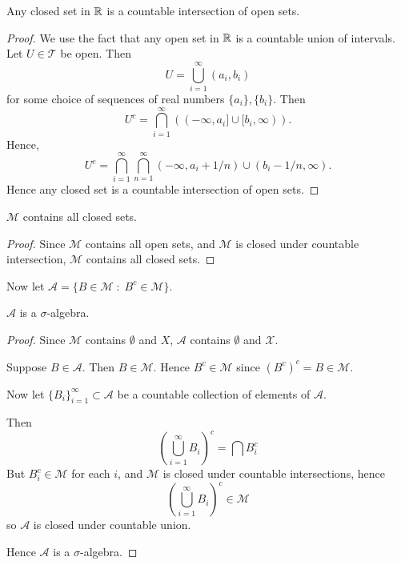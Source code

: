 \documentclass{unswmaths}
\begin{document}
\begin{lemma}
    Any closed set in $\mathbb{R}$ is a countable intersection of open sets.
\end{lemma} 
\begin{proof}
    We use the fact that any open set in $\mathbb{R}$ is a countable
    union of intervals. Let $U \in \mathcal{T}$ be open. Then
    \begin{equation*}
        U = \bigcup_{i=1}^\infty (a_i,b_i)
    \end{equation*}
    for some choice of sequences of real numbers $\{a_i\},\{b_i\}$. 
    Then
    \begin{equation*}
        U^c = \bigcap_{i=1}^\infty ((-\infty,a_i]\cup[b_i,\infty)).
    \end{equation*}
    Hence,
    \begin{equation*}
        U^c = \bigcap_{i=1}^\infty \bigcap_{n=1}^\infty (-\infty,a_i+1/n)\cup(b_i-1/n,\infty).
    \end{equation*}
    Hence any closed set is a countable intersection of open sets.    
\end{proof}
\begin{lemma}
    $\mathcal{M}$ contains all closed sets.
\end{lemma}
\begin{proof}
    Since $\mathcal{M}$ contains all open sets, and $\mathcal{M}$ is closed
    under countable intersection, $\mathcal{M}$ contains all closed sets.    
\end{proof}
Now let $\mathcal{A} = \{B \in \mathcal{M}\;:\;B^c \in \mathcal{M}\}$.
\begin{lemma}
    $\mathcal{A}$ is a $\sigma$-algebra.
\end{lemma}
\begin{proof}
    Since $\mathcal{M}$ contains $\emptyset$ and $X$, $\mathcal{A}$ contains
    $\emptyset$ and $\mathcal{X}$.
    
    Suppose $B \in \mathcal{A}$. Then $B \in \mathcal{M}$. Hence $B^c \in \mathcal{M}$
    since $(B^{c})^c = B \in \mathcal{M}$.
    
    Now let $\{B_i\}_{i=1}^\infty \subset \mathcal{A}$ be a countable collection of elements
    of $\mathcal{A}$.
    
    Then
    \begin{equation*}
        \left(\bigcup_{i=1}^\infty B_i\right)^c = \bigcap B_i^c
    \end{equation*}
    But $B_i^c \in \mathcal{M}$ for each $i$, and $\mathcal{M}$
    is closed under countable intersections, hence 
    \begin{equation*}
        \left(\bigcup_{i=1}^\infty B_i\right)^c \in \mathcal{M}
    \end{equation*}
    so $\mathcal{A}$ is closed under countable union.
    
    Hence $\mathcal{A}$ is a $\sigma$-algebra.
    
\end{proof}
\end{document}
